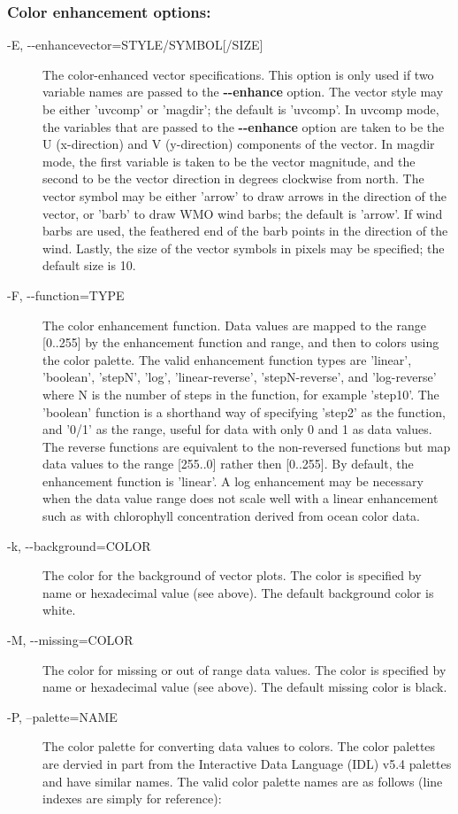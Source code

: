 \subsubsection*{Color enhancement options:}
\begin{description}
\item[-E, -{-}enhancevector=STYLE/SYMBOL[/SIZE{]}]The color-enhanced vector specifications. This option is only used if two variable names are passed to the \textbf{-{-}enhance}
 option. The vector style may be either 'uvcomp' or 'magdir'; the default is 'uvcomp'. In uvcomp mode, the variables that are passed to the \textbf{-{-}enhance}
 option are taken to be the U (x-direction) and V (y-direction) components of the vector. In magdir mode, the first variable is taken to be the vector magnitude, and the second to be the vector direction in degrees clockwise from north. The vector symbol may be either 'arrow' to draw arrows in the direction of the vector, or 'barb' to draw WMO wind barbs; the default is 'arrow'. If wind barbs are used, the feathered end of the barb points in the direction of the wind. Lastly, the size of the vector symbols in pixels may be specified; the default size is 10.
\item[-F, -{-}function=TYPE]The color enhancement function. Data values are mapped to the range [0..255] by the enhancement function and range, and then to colors using the color palette. The valid enhancement function types are 'linear', 'boolean', 'stepN', 'log', 'linear-reverse', 'stepN-reverse', and 'log-reverse' where N is the number of steps in the function, for example 'step10'. The 'boolean' function is a shorthand way of specifying 'step2' as the function, and '0/1' as the range, useful for data with only 0 and 1 as data values. The reverse functions are equivalent to the non-reversed functions but map data values to the range [255..0] rather then [0..255]. By default, the enhancement function is 'linear'. A log enhancement may be necessary when the data value range does not scale well with a linear enhancement such as with chlorophyll concentration derived from ocean color data. 
\item[-k, -{-}background=COLOR]The color for the background of vector plots. The color is specified by name or hexadecimal value (see above). The default background color is white.
\item[-M, -{-}missing=COLOR]The color for missing or out of range data values. The color is specified by name or hexadecimal value (see above). The default missing color is black.
\item[-P, --palette=NAME]The color palette for converting data values to colors. The color palettes are dervied in part from the Interactive Data Language (IDL) v5.4 palettes and have similar names. The valid color palette names are as follows (line indexes are simply for reference): \begin{verbatim}


\end{verbatim}
\end{description}
